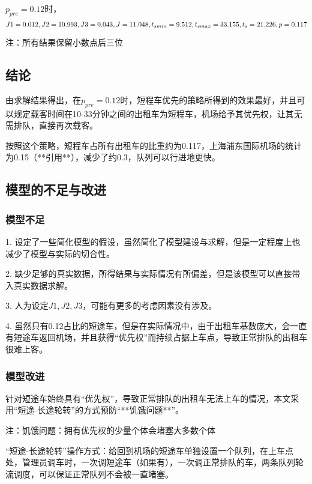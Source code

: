 \documentclass[UTF8]{ctexart}
\begin{document}
	$p_{pre}=0.12$时，
	$$
	J1 = 0.012, \\
	J2 = 10.993, \\
	J3 = 0.043, \\
	J = 11.048, \\
	t_{smin} = 9.512, \\
	t_{smax} = 33.155,\\
	t_s = 21.226,\\
	p = 0.117 \\
	$$
	
	注：所有结果保留小数点后三位
	
	

	\subsection{结论}
	由求解结果得出，在$p_{pre}=0.12$时，短程车优先的策略所得到的效果最好，并且可以规定载客时间在10-33分钟之间的出租车为短程车，机场给予其优先权，让其无需排队，直接再次载客。
	
	按照这个策略，短程车占所有出租车的比重约为0.117，上海浦东国际机场的统计为0.15（**引用**），减少了约0.3，队列可以行进地更快。
	
	\subsection{模型的不足与改进}
	\subsubsection{模型不足}
	1. 设定了一些简化模型的假设，虽然简化了模型建设与求解，但是一定程度上也减少了模型与实际的切合性。

	2. 缺少足够的真实数据，所得结果与实际情况有所偏差，但是该模型可以直接带入真实数据求解。
	
	3. 人为设定$J1,J2,J3$，可能有更多的考虑因素没有涉及。
	
	4. 虽然只有0.12占比的短途车，但是在实际情况中，由于出租车基数庞大，会一直有短途车返回机场，并且获得“优先权”而持续占据上车点，导致正常排队的出租车很难上客。
	
	\subsubsection{模型改进}
	针对短途车始终具有“优先权”，导致正常排队的出租车无法上车的情况，本文采用“短途-长途轮转”的方式预防“**饥饿问题**”。
	
	注：饥饿问题：拥有优先权的少量个体会堵塞大多数个体
	
	“短途-长途轮转”操作方式：给回到机场的短途车单独设置一个队列，在上车点处，管理员调车时，一次调短途车（如果有），一次调正常排队的车，两条队列轮流调度，可以保证正常队列不会被一直堵塞。
	
\end{document}
